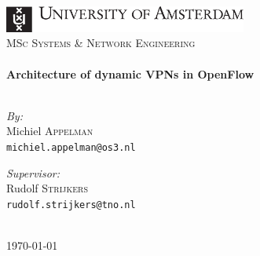 %		
%		
%		

\clearpage
\begin{titlepage}
	\begin{center}
		\hfill \\[2cm]
		\includegraphics[width=8cm]{./includes/uva.pdf}\\[0.4cm]
		{\Large \textsc{MSc Systems \&{} Network Engineering}}\\[4.5cm]
		
		\HRule \\[0.6cm]
		{ \huge \bfseries Architecture of dynamic VPNs in OpenFlow}\\[0.4cm]
		\HRule \\[4.2cm]
		\begin{minipage}
			{0.4
			\textwidth} 
			\begin{flushleft}
				\large \emph{By:}\\
				Michiel \textsc{Appelman} \\
				{\footnotesize \texttt{michiel.appelman@os3.nl}}
			\end{flushleft}
		\end{minipage}
		\begin{minipage}
			{0.4
			\textwidth} 
			\begin{flushright}
				\large \emph{Supervisor:} \\
				Rudolf \textsc{Strijkers} \\
				{\footnotesize \texttt{rudolf.strijkers@tno.nl}}
				\hfill
			\end{flushright}
		\end{minipage}
		
		\hfill \\[4cm]
		
		{\large \today}
	\end{center}
\end{titlepage}

\cleardoublepage 
